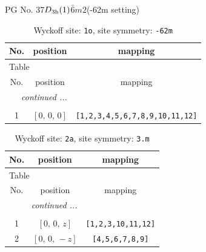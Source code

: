 \documentclass[fleqn,8pt]{jsarticle}
\begin{document}
\setcounter{MaxMatrixCols}{32}

\renewcommand{\tablename}{Table~}
\renewcommand{\figurename}{Figure~}
\begin{center}
\LARGE
PG No. 37\quad$D_{\rm 3h}(1)$\quad$\bar{6}m2$\quad(-62m setting)\quad[ hexagonal ]
\end{center}
\renewcommand{\arraystretch}{1.2}
\begin{longtable}{ccc}
\caption{Wyckoff site: {\tt 1o}, site symmetry: {\tt -62m}}
 \\
 \hline \hline
No. & position & mapping \\ \hline \endfirsthead

\multicolumn{2}{l}{\tablename\ \thetable{}} \\
 \hline \hline
No. & position & mapping \\ \hline \endhead

 \hline \hline
\multicolumn{2}{r}{\footnotesize\it continued ...} \\ \endfoot

 \hline \hline
\multicolumn{2}{r}{} \\ \endlastfoot

1 & $\left[ 0,\, 0,\, 0 \right]$ & {\tt [1,2,3,4,5,6,7,8,9,10,11,12]} \\
\end{longtable}
\renewcommand{\arraystretch}{1.2}
\begin{longtable}{ccc}
\caption{Wyckoff site: {\tt 2a}, site symmetry: {\tt 3.m}}
 \\
 \hline \hline
No. & position & mapping \\ \hline \endfirsthead

\multicolumn{2}{l}{\tablename\ \thetable{}} \\
 \hline \hline
No. & position & mapping \\ \hline \endhead

 \hline \hline
\multicolumn{2}{r}{\footnotesize\it continued ...} \\ \endfoot

 \hline \hline
\multicolumn{2}{r}{} \\ \endlastfoot

1 & $\left[ 0,\, 0,\, z \right]$ & {\tt [1,2,3,10,11,12]} \\ \hline
2 & $\left[ 0,\, 0,\, - z \right]$ & {\tt [4,5,6,7,8,9]} \\
\end{longtable}
\renewcommand{\arraystretch}{1.2}
\end{document}
